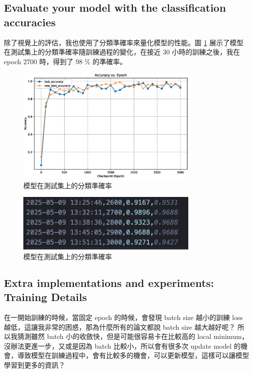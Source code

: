 \subsection{Evaluate your model with the classification accuracies}

除了視覺上的評估，我也使用了分類準確率來量化模型的性能。圖 \ref{fig:accuracy_plot} 展示了模型在測試集上的分類準確率隨訓練過程的變化，在接近 30 小時的訓練之後，我在 epoch 2700 時，得到了 98 \% 的準確率。

\begin{figure}[H]
    \centering
    \includegraphics[width=0.8\textwidth]{figures/accuracy_plot.eps}
    \caption{模型在測試集上的分類準確率}
    \label{fig:accuracy_plot}
\end{figure}

\begin{figure}[H]
    \centering
    \includegraphics[width=0.8\textwidth]{figures/accuracy.png}
    \caption{模型在測試集上的分類準確率}
    \label{fig:accuracy}
\end{figure}


\subsection{Extra implementations and experiments: Training Details}

在一開始訓練的時候，當固定 epoch 的時候，會發現 batch size 越小的訓練 loss 越低，這讓我非常的困惑，那為什麼所有的論文都說 batch size 越大越好呢？ 所以我猜測雖然 batch 小的收斂快，但是可能很容易卡在比較高的 local minimum，沒辦法更進一步，又或是因為 batch 比較小，所以會有很多次 update model 的機會，導致模型在訓練過程中，會有比較多的機會，可以更新模型，這樣可以讓模型學習到更多的資訊？

